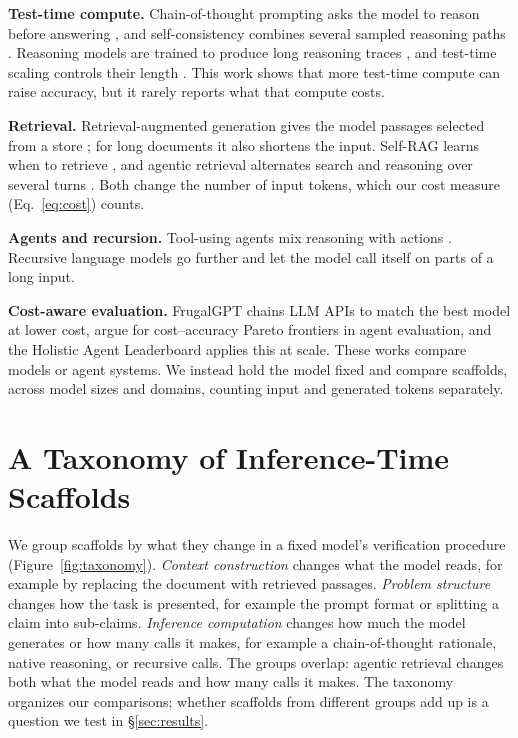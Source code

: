 \documentclass[11pt]{article}
\begin{document}
\noindent \textbf{Test-time compute.}
Chain-of-thought prompting asks the model to reason before answering
\citep{wei2022cot}, and self-consistency combines several sampled
reasoning paths \citep{wang2023selfconsistency}. Reasoning models are
trained to produce long reasoning traces \citep{deepseekai2025r1}, and
test-time scaling controls their length \citep{muennighoff2025s1}. This
work shows that more test-time compute can raise accuracy, but it rarely
reports what that compute costs.

\noindent \textbf{Retrieval.}
Retrieval-augmented generation gives the model passages selected from a
store \citep{lewis2020rag}; for long documents it also shortens the input.
Self-RAG learns when to retrieve \citep{asai2024selfrag}, and agentic
retrieval alternates search and reasoning over several turns
\citep{trivedi2023ircot, singh2025agenticrag}. Both change the number of
input tokens, which our cost measure (Eq.~\ref{eq:cost}) counts.

\noindent \textbf{Agents and recursion.}
Tool-using agents mix reasoning with actions \citep{yao2023react}.
Recursive language models \citep{zhang2025rlm} go further and let the
model call itself on parts of a long input.

\noindent \textbf{Cost-aware evaluation.}
FrugalGPT \citep{chen2024frugalgpt} chains LLM APIs to match the best model
at lower cost, \citet{kapoor2025agents} argue for cost--accuracy Pareto
frontiers in agent evaluation, and the Holistic Agent Leaderboard
\citep{kapoor2026hal} applies this at scale. These works compare models or
agent systems. We instead hold the model fixed and compare scaffolds,
across model sizes and domains, counting input and generated tokens
separately.

\section{A Taxonomy of Inference-Time Scaffolds}
\label{sec:taxonomy}

We group scaffolds by what they change in a fixed model's verification
procedure (Figure~\ref{fig:taxonomy}). \emph{Context construction} changes
what the model reads, for example by replacing the document with retrieved
passages. \emph{Problem structure} changes how the task is presented, for
example the prompt format or splitting a claim into sub-claims.
\emph{Inference computation} changes how much the model generates or how
many calls it makes, for example a chain-of-thought rationale, native
reasoning, or recursive calls. The groups overlap: agentic retrieval
changes both what the model reads and how many calls it makes. The
taxonomy organizes our comparisons; whether scaffolds from different
groups add up is a question we test in \S\ref{sec:results}.
\end{document}
